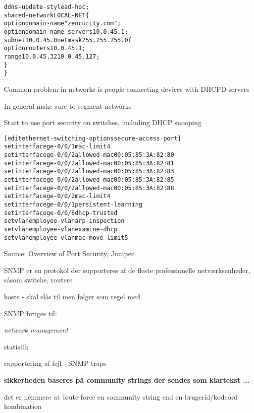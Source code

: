 \documentclass[Screen16to9,17pt]{foils}
\begin{document}
\begin{alltt}
\small
ddns-update-style ad-hoc;
shared-network LOCAL-NET \{
    option  domain-name "zencurity.com";
    option  domain-name-servers 10.0.45.1;
    subnet 10.0.45.0 netmask 255.255.255.0 \{
            option routers 10.0.45.1;
            range 10.0.45.32 10.0.45.127;
    \}
\}
\end{alltt}


\begin{list1}
\item Common problem in networks is people connecting devices with DHCPD servers
\item In general make sure to segment networks
\item Start to use port security on switches, including DHCP snooping\\
\end{list1}


\begin{alltt}\small
[edit ethernet-switching-options secure-access-port]
set interface ge-0/0/1 mac-limit 4
set interface ge-0/0/2 allowed-mac 00:05:85:3A:82:80
set interface ge-0/0/2 allowed-mac 00:05:85:3A:82:81
set interface ge-0/0/2 allowed-mac 00:05:85:3A:82:83
set interface ge-0/0/2 allowed-mac 00:05:85:3A:82:85
set interface ge-0/0/2 allowed-mac 00:05:85:3A:82:88
set interface ge-0/0/2 mac-limit 4
set interface ge-0/0/1 persistent-learning
set interface ge-0/0/8 dhcp-trusted
set vlan employee-vlan arp-inspection
set vlan employee-vlan examine-dhcp
set vlan employee-vlan mac-move-limit 5
\end{alltt}

Source: Overview of Port Security, Juniper\\ {\small{}}


\begin{list1}
\item SNMP er en protokol der supporteres af de fleste professionelle
  netværksenheder, såsom switche, routere
\item hosts - skal slås til men følger som regel med
\item SNMP bruges til:
  \begin{list2}
    \item \emph{network management}
    \item statistik
    \item rapportering af fejl - SNMP traps
  \end{list2}
\item {\bfseries sikkerheden baseres på community strings der sendes
    som klartekst ...}
\item det er nemmere at brute-force en community string end en
  brugerid/kodeord kombination
\end{list1}
\end{document}

